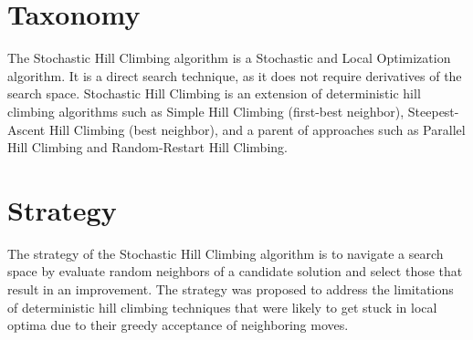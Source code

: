 \documentclass[a4paper, 11pt]{article}
\begin{document}
\section{Taxonomy}
\label{sec:taxonomy}
The Stochastic Hill Climbing algorithm is a Stochastic and Local Optimization algorithm. It is a direct search technique, as it does not require derivatives of the search space.
Stochastic Hill Climbing is an extension of deterministic hill climbing algorithms such as Simple Hill Climbing (first-best neighbor), Steepest-Ascent Hill Climbing (best neighbor), and a parent of approaches such as Parallel Hill Climbing and Random-Restart Hill Climbing.

\section{Strategy}
\label{sec:strategy}
The strategy of the Stochastic Hill Climbing algorithm is to navigate a search space by evaluate random neighbors of a candidate solution and select those that result in an improvement. The strategy was proposed to address the limitations of deterministic hill climbing techniques that were likely to get stuck in local optima due to their greedy acceptance of neighboring moves. 

\end{document}

